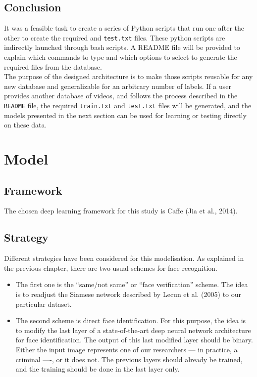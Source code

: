 \subsection{Conclusion}
It was a feasible task to create a series of Python scripts that run one after the other to create the required  and \texttt{test.txt} files. These python scripts are indirectly launched through bash scripts. A README file will be provided to explain which commands to type and which options to select to generate the required files from the database.\\

The purpose of the designed architecture is to make those scripts reusable for any new database and generalizable for an arbitrary number of labels. If a user provides another database of videos, and follows the process described in the \texttt{README} file, the required \texttt{train.txt} and \texttt{test.txt} files will be generated, and the models presented in the next section can be used for learning or testing directly on these data.

\section{Model}

\subsection{Framework}
The chosen deep learning framework for this study is Caffe (Jia et al., 2014).\\

\subsection{Strategy}
Different strategies have been considered for this modelisation. As explained in the previous chapter, there are two usual schemes for face recognition.
\begin{itemize}
\item The first one is the \enquote{same/not same} or \enquote{face verification} scheme. The idea is to readjust the Siamese network described by Lecun et al. (2005) to our particular dataset.\newline
\item The second scheme is direct face identification. For this purpose, the idea is to modify the last layer of a state-of-the-art deep neural network architecture for face identification. The output of this last modified layer should be binary. Either the input image represents one of our researchers --- in practice, a criminal ----, or it does not. The previous layers should already be trained, and the training should be done in the last layer only.
\end{itemize}
